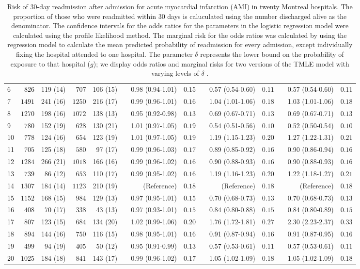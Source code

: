 \documentclass[]{article}\usepackage[]{graphicx}\usepackage[]{color}
\begin{document}
\begin{landscape}
\begin{table}[!tbp]
\begin{center}
\begin{tabular}{lrrrrcrrcrrcrr}
6&$ 826$&119 (14)&$ 707$&106 (15)&&0.98 (0.94-1.01)&$0.15$&&0.57 (0.54-0.60)&$0.11$&&0.57 (0.54-0.60)&$0.11$\tabularnewline
7&$1491$&241 (16)&$1250$&216 (17)&&0.99 (0.96-1.01)&$0.16$&&1.04 (1.01-1.06)&$0.18$&&1.03 (1.01-1.06)&$0.18$\tabularnewline
8&$1270$&198 (16)&$1072$&138 (13)&&0.95 (0.92-0.98)&$0.13$&&0.69 (0.67-0.71)&$0.13$&&0.69 (0.67-0.71)&$0.13$\tabularnewline
9&$ 780$&152 (19)&$ 628$&130 (21)&&1.01 (0.97-1.05)&$0.19$&&0.54 (0.51-0.56)&$0.10$&&0.52 (0.50-0.54)&$0.10$\tabularnewline
10&$ 778$&124 (16)&$ 654$&123 (19)&&1.01 (0.97-1.05)&$0.19$&&1.19 (1.15-1.23)&$0.20$&&1.27 (1.22-1.31)&$0.21$\tabularnewline
11&$ 705$&125 (18)&$ 580$&97 (17)&&0.99 (0.96-1.03)&$0.17$&&0.89 (0.85-0.92)&$0.16$&&0.90 (0.86-0.94)&$0.16$\tabularnewline
12&$1284$&266 (21)&$1018$&166 (16)&&0.99 (0.96-1.02)&$0.16$&&0.90 (0.88-0.93)&$0.16$&&0.90 (0.88-0.93)&$0.16$\tabularnewline
13&$ 739$&86 (12)&$ 653$&110 (17)&&0.99 (0.95-1.02)&$0.16$&&1.19 (1.16-1.23)&$0.20$&&1.22 (1.18-1.27)&$0.21$\tabularnewline
14&$1307$&184 (14)&$1123$&210 (19)&&(Reference)&$0.18$&&(Reference)&$0.18$&&(Reference)&$0.18$\tabularnewline
15&$1152$&168 (15)&$ 984$&129 (13)&&0.97 (0.95-1.01)&$0.15$&&0.70 (0.68-0.73)&$0.13$&&0.70 (0.68-0.73)&$0.13$\tabularnewline
16&$ 408$&70 (17)&$ 338$&43 (13)&&0.97 (0.93-1.01)&$0.15$&&0.84 (0.80-0.88)&$0.15$&&0.84 (0.80-0.89)&$0.15$\tabularnewline
17&$ 807$&123 (15)&$ 684$&134 (20)&&1.02 (0.99-1.06)&$0.20$&&1.76 (1.72-1.81)&$0.27$&&2.30 (2.23-2.37)&$0.33$\tabularnewline
18&$ 894$&144 (16)&$ 750$&116 (15)&&0.98 (0.95-1.01)&$0.16$&&0.91 (0.87-0.94)&$0.16$&&0.91 (0.87-0.95)&$0.16$\tabularnewline
19&$ 499$&94 (19)&$ 405$&50 (12)&&0.95 (0.91-0.99)&$0.13$&&0.57 (0.53-0.61)&$0.11$&&0.57 (0.53-0.61)&$0.11$\tabularnewline
20&$1025$&184 (18)&$ 841$&143 (17)&&0.99 (0.96-1.02)&$0.17$&&1.05 (1.02-1.09)&$0.18$&&1.05 (1.02-1.09)&$0.18$\tabularnewline
\hline
\end{tabular}

\caption{Risk of 30-day readmission after admission for  acute myocardial infarction (AMI)  in twenty Montreal hospitals.  The proportion of those who were readmitted within 30 days is caluculated using the number discharged alive as the denominator. The confidence intervals for the odds ratios for the parameters in the logistic regression model were calculated using the profile likelihood method. The marginal risk for the odds ratios was calculated by using the regression model to calculate the mean predicted probability of readmission for every admission, except individually fixing the hospital attended to one hospital. The parameter $\delta$ represents the lower bound on the probability of exposure to that hospital ($g$); we display odds ratios and marginal risks for two versions of the TMLE model with varying levels of $\delta$ .\label{ami_table}}\end{center}


\end{table}
\end{landscape}
\end{document}
